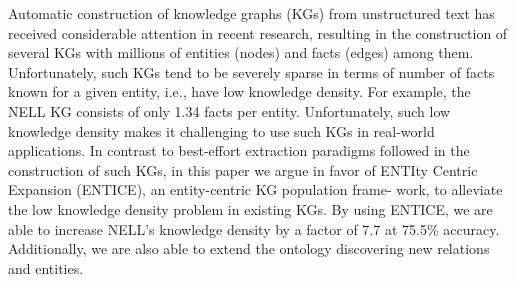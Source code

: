 Automatic construction of knowledge graphs (KGs) from unstructured text has received considerable attention in recent research, resulting in the construction of several KGs with millions of entities (nodes) and facts (edges) among them. Unfortunately, such KGs tend to be severely sparse in terms of number of facts known for a given entity, i.e., have low knowledge density. For example, the NELL KG consists of only 1.34 facts per entity. Unfortunately, such low knowledge density makes it challenging to use such KGs in real-world applications. In contrast to best-effort extraction paradigms followed in the construction of such KGs, in this paper we argue in favor of ENTIty Centric Expansion (ENTICE), an entity-centric KG population frame- work, to alleviate the low knowledge density problem in existing KGs. By using ENTICE, we are able to increase NELL's knowledge density by a factor of 7.7 at 75.5\% accuracy. Additionally, we are also able to extend the ontology discovering new relations and entities.
